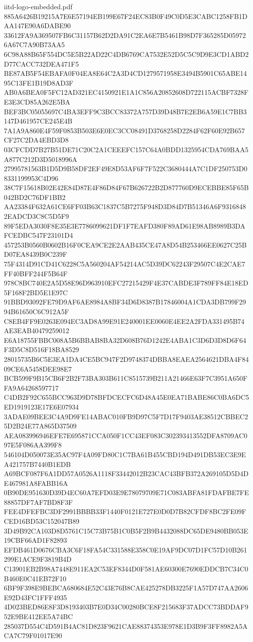 \begin{filecontents*}[overwrite]{iitd-logo-embedded.pdf}
885A6426B19215A7E6E57194EB199E67F24EC83B0F49C0D5E3CABC1258FB1DAA147E90A6DABE90
33612FA9A369507FB6C31157B62D2DA91C2EA6E7B5461B98D7F365285D059726A67C7A90B73AA5
6C98A88B65F554DC5E5B22AD22C4DB6769CA7532E52D5C5C9D9E3CD1ABD2D77CACC732DEA471F5
BE87AB5F54EBAFA0F04EA8E64C2A3D4CD1279571958E3494B5901C65ABE1495C13FE1B19D8AD3F
AB0A6BEA0F5FC12AD321EC4150921E1A1C856A20852608D722115ACBF7328FE3E3CD85A262E5BA
BEF3BC05055697C4BA3EFF9C3BCC83372A757D39D48B7E2EB6A59E1C7BB3147D461957CE245E4B
7A1A9A860E4F59F0853B503E6E0EC3CC08491D3768258D2284F62F60E92B657CF27C2DA4EBD3D8
03CFCDD7B27B51DE71C20C2A1CEEEFC157C64A0BDD1325954CDA769BAA5A877C212D3D5018996A
27995781563B1D5D9B58DF2EF49E8D53AF6F7F522C3680444A7C1DF250753D08331199953C4D96
38C7F15618B02E42E84D87E4F86D84F67B626722B2D877760D9ECEBBE85F65B042BD2C76DF1BB2
AA23384F632A61CE6FF03B63C1837C5B7275F948D3D84D7B51346A6F93168482EADCD3C8C5D5F9
89F5EDA3030F8E35E3E7786099621DF1F7EAFD380F89AD61E98AB8989B3DAFCEDBC547F23101D4
457253B0560B0602B16F0CEA9CE2E2AAB435CE47A8D54B253466EE0627C25BD07EA8439B0C239F
75F4314D91CD41C6228C5A560204AF54214AC5D39DC62243F29507C4E2CAE7FF40BFF244F5B64F
978C8BC740E2A5D58E96D963910EFC27215429F4E37CABDE3F789FF84E18ED5F168F2BD5E1E97C
91BBD93092FE79D9AF6AE8984A8BF34D6D8387B17846004A1CDA3DB799F2994B61650C6C912A5F
C8EB4FF9E0263E094EC3AD8A99E91E240001EE0060E4EE2A2FDA331495B74AE3EAB40479259012
E6A18755FBBC008A5B6BBAB8BA32D608B76D1242E4ABA1C3D6D3D8D6F64F3D5C8D516F18BA8529
28015735B6C5E3EA1DA4CE5BC947F2D9748374DBBA8EAEA2564621DBA4F8409CE6A5458DEE98E7
BCB599F9B15CB6F2B2F73BA303B611C8515739B211A21466E63F7C3951A650FFA9A64268597717
C4DB2F92C655BCC963D9D78BFDCECFC6D48A45E0EA71BABE86C0BA6DC5ED1919123E17E6E07934
3ADAE09BEE3C4A9D9FE14ABAC010FB9D97C5F7D17F9403AE38512CBBEC25D2B24E77A865D37509
AEA083996946EFE7E695871CCA050F1CC43EF083C302393413552DFA8709AC097E5F086AA399F8
546104D050073E35AC97F4A09FD80C1C7BA61B455CBD194D491DB53EC3E9EA421757B7440B1EDB
A69BCF087F6A1DD57A0526A1118F33442012B23CAC43BFB372A269105D5D4DE467981A8FABB16A
0B90DE951630D39D4EC60A7EFD03E9E78079709E71C083ABFA81FDAFBE7FE88857DF7AF7BD8F3F
FEE4DFEFBC3DF2991BBBB33F1440F0121E727E0D0D7B82CFDF8BC2FE09FCED16BD53C152047B89
3D49B92CA103D8D5761C15C73B75B1C0B5F2B9B4432088DC65DE9480BB053E19CBF66AD1F82893
EFDB461D0676CBA3C6F18FA54C331588E358C0E19AF9DC07D1FC57D10B261299E1ACE9F3819B4D
C13901EB2B98A7448E911EA2C53EF8344D0F581AE60300E7690EDDCB7C34C0B460E0C41EB72F10
6BF9F398E9BEBCA680684E52C43E76B8CAE425278DB3225F1A57D747AA2606E92D43FC1FFF4935
4D023BED86E8F3D8193403B7E0D34C00280BCE8F215683F37ADCC73BDDAF952E9BE412EE5A74BC
285037D554C4D591B4AC81D823F9621CAE88374353E978E1D3B9F3FF8982A5ACA7C79F01017E90

\end{filecontents*}
